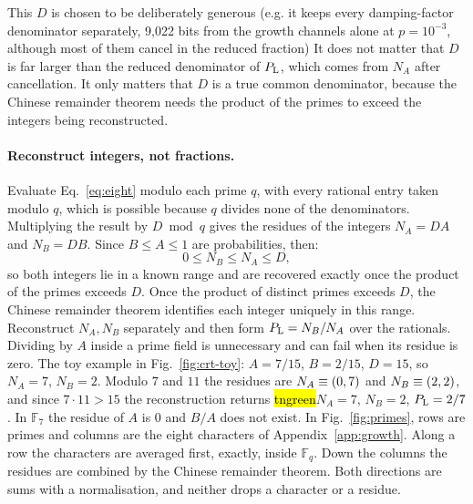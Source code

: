 This $D$ is chosen to be deliberately generous (e.g. it keeps every damping-factor denominator separately, 9,022 bits from the growth channels alone at $p=10^{-3}$, although most of them cancel in the reduced fraction)
It does not matter that $D$ is far larger than the reduced denominator of $P_{\mathrm L}$, which comes from $N_A$ after cancellation. 
It only matters that $D$ is a true common denominator, because the Chinese remainder theorem needs the product of the primes to exceed the integers being reconstructed.

\paragraph{Reconstruct integers, not fractions.} 
Evaluate Eq.~\eqref{eq:eight} modulo each prime $q$, with every rational entry taken modulo $q$, which is possible because $q$ divides none of the denominators. 
Multiplying the result by $D\bmod q$ gives the residues of the integers $N_A=DA$ and $N_B=DB$. 
Since $B\le A\le1$ are probabilities, then:
\begin{equation}
 0\le N_B\le N_A\le D,
 \label{eq:height}
\end{equation}
so both integers lie in a known range and are recovered exactly once the product of the primes exceeds $D$.
Once the product of distinct primes exceeds $D$, the Chinese remainder theorem identifies each integer uniquely in this range. Reconstruct $N_A,N_B$ separately and then form $P_{\mathrm L}=N_B/N_A$ over the rationals. Dividing by $A$ inside a prime field is unnecessary and can fail when its residue is zero. The toy example in Fig.~\ref{fig:crt-toy}: $A=7/15$, $B=2/15$, $D=15$, so $N_A=7$, $N_B=2$. Modulo $7$ and $11$ the residues are $N_A\equiv(0, 7)$ and $N_B\equiv(2, 2)$, and since $7\cdot11>15$ the reconstruction returns \hl{tngreen}{$N_A=7$, $N_B=2$}, $P_{\mathrm L}=2/7$. In $\mathbb F_7$ the residue of $A$ is $0$ and $B/A$ does not exist. In Fig.~\ref{fig:primes}, rows are primes and columns are the eight characters of Appendix~\ref{app:growth}. Along a row the characters are averaged first, exactly, inside $\mathbb F_q$. Down the columns the residues are combined by the Chinese remainder theorem. 
Both directions are sums with a normalisation, and neither drops a character or a residue.
\color{black}


